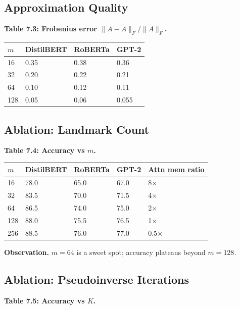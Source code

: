 \subsection{Approximation Quality}

\textbf{Table 7.3: Frobenius error $\|A - \tilde{A}\|_F / \|A\|_F$.}

\begin{table}[H]
\centering
\small
\begin{tabular}{llll}
\toprule
\textbf{$m$} & \textbf{DistilBERT} & \textbf{RoBERTa} & \textbf{GPT-2} \\
\midrule
16 & 0.35 & 0.38 & 0.36 \\
32 & 0.20 & 0.22 & 0.21 \\
64 & 0.10 & 0.12 & 0.11 \\
128 & 0.05 & 0.06 & 0.055 \\
\bottomrule
\end{tabular}
\end{table}

\subsection{Ablation: Landmark Count}

\textbf{Table 7.4: Accuracy vs $m$.}

\begin{table}[H]
\centering
\small
\begin{tabular}{lllll}
\toprule
\textbf{$m$} & \textbf{DistilBERT} & \textbf{RoBERTa} & \textbf{GPT-2} & \textbf{Attn mem ratio} \\
\midrule
16 & 78.0 & 65.0 & 67.0 & 8$\times$ \\
32 & 83.5 & 70.0 & 71.5 & 4$\times$ \\
64 & 86.5 & 74.0 & 75.0 & 2$\times$ \\
128 & 88.0 & 75.5 & 76.5 & 1$\times$ \\
256 & 88.5 & 76.0 & 77.0 & 0.5$\times$ \\
\bottomrule
\end{tabular}
\end{table}

\textbf{Observation.} $m = 64$ is a sweet spot; accuracy plateaus beyond $m = 128$.

\subsection{Ablation: Pseudoinverse Iterations}

\textbf{Table 7.5: Accuracy vs $K$.}


